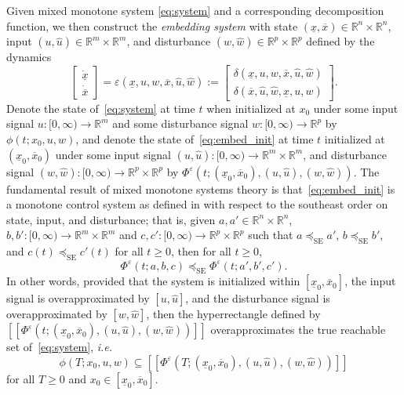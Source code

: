 \documentclass[preprint,12pt]{elsarticle}
\newcommand{\ul}{\underline}
\newcommand{\ol}{\overline}
\begin{document}
Given mixed monotone system \eqref{eq:system} and a corresponding decomposition function, we then construct the \emph{embedding system} with state $(\ul{x}, \ol{x}) \in \mathbb{R}^n\times \mathbb{R}^n$, input $(u,\widehat{u}) \in \mathbb{R}^m\times\mathbb{R}^m$, and disturbance $(w, \widehat{w}) \in \mathbb{R}^p \times \mathbb{R}^p$ defined by the dynamics
\begin{equation}
\label{eq:embed_init}
    \begin{bmatrix}
    \dot{\ul{x}} \\
    \dot{\ol{x}}
    \end{bmatrix} = \varepsilon(\ul{x}, u, w, \ol{x}, \widehat{u},\widehat{w}) :=
    \begin{bmatrix}
    \delta(\ul{x}, u, w, \ol{x}, \widehat{u},\widehat{w}) \\
    \delta(\ol{x}, \widehat{u}, \widehat{w}, \ul{x}, u, w)
    \end{bmatrix}.
\end{equation}
Denote the state of~\eqref{eq:system} at time $t$ when initialized at $x_0$ under some input signal $u:[0,\infty)\to\mathbb{R}^m$ and some disturbance signal $w:[0,\infty)\to\mathbb{R}^p$ by $\phi(t; x_0, u, w)$, and denote the state of~\eqref{eq:embed_init} at time $t$ initialized at $(\ul{x}_0,\ol{x}_0)$ under some input signal $(u, \widehat{u}):[0,\infty)\to\mathbb{R}^m\times\mathbb{R}^m$, and disturbance signal $(w,\widehat{w}):[0,\infty)\to\mathbb{R}^p\times \mathbb{R}^p$ by $\Phi^\varepsilon(t;(\ul{x}_0, \ol{x}_0), (u,\widehat{u}), (w, \widehat{w}))$. The fundamental result of mixed monotone systems theory is that~\eqref{eq:embed_init} is a monotone control system as defined in \cite{angeliMonotone} with respect to the southeast order on state, input, and disturbance; that is, given $a, a' \in \mathbb{R}^n\times \mathbb{R}^n$, $b, b':[0, \infty) \rightarrow \mathbb{R}^m\times\mathbb{R}^m$ and $c, c':[0, \infty) \rightarrow \mathbb{R}^p\times \mathbb{R}^p$ such that $a \preceq_\text{SE} a'$, $b \preceq_\text{SE} b'$, and $c(t) \preceq_\text{SE} c'(t)$ for all $t\geq0$, then for all $t\geq0$,
\begin{equation}
    \Phi^\varepsilon(t; a, b, c) \preceq_\text{SE} \Phi^\varepsilon(t; a', b', c').
    \label{eq:monotone_system}
\end{equation}
In other words, provided that the system is initialized within $[\ul{x}_0, \ol{x}_0]$, the input signal is overapproximated by $[u, \widehat{u}]$, and the disturbance signal is overapproximated by $[w, \widehat{w}]$, then the hyperrectangle defined by $[\![\Phi^\varepsilon(t;(\ul{x}_0, \ol{x}_0), (u,\widehat{u}), (w, \widehat{w}))]\!]$ overapproximates the true reachable set 
of~\eqref{eq:system}, \emph{i.e.}
\begin{equation}
    \phi(T; x_0, u, w) \subseteq [\![\Phi^\varepsilon(T;(\ul{x}_0, \ol{x}_0), (u,\widehat{u}), (w, \widehat{w}))]\!]
\end{equation}
for all $T \geq 0$ and $x_0 \in [\ul{x}_0, \ol{x}_0]$.
\end{document}
